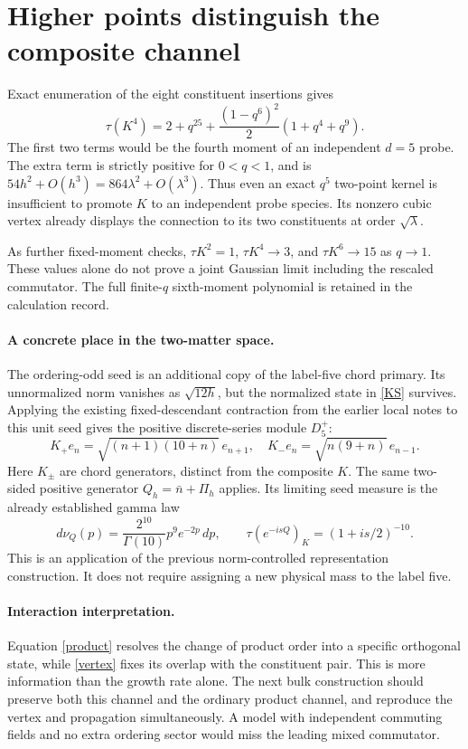 \documentclass[11pt,a4paper]{article}
\newcommand{\av}[1]{\tau\!\left(#1\right)}
\begin{document}
\newpage
\section{Higher points distinguish the composite channel}
Exact enumeration of the eight constituent insertions gives
\begin{equation}
 \boxed{\av{K^4}=2+q^{25}
       +\frac{(1-q^6)^2}{2}(1+q^4+q^9).}\label{fourth}
\end{equation}
The first two terms would be the fourth moment of an independent
$d=5$ probe. The extra term is strictly positive for $0<q<1$, and
is $54h^2+O(h^3)=864\lambda^2+O(\lambda^3)$. Thus even an exact
$q^5$ two-point kernel is insufficient to promote $K$ to an independent
probe species. Its nonzero cubic vertex already displays the connection
to its two constituents at order $\sqrt\lambda$.

As further fixed-moment checks, $\tau K^2=1$, $\tau K^4\to3$, and
$\tau K^6\to15$ as $q\to1$. These values alone do not prove a joint
Gaussian limit including the rescaled commutator. The full finite-$q$
sixth-moment polynomial is retained in the calculation record.

\paragraph{A concrete place in the two-matter space.}
The ordering-odd seed is an additional copy of the label-five chord
primary. Its unnormalized norm vanishes as $\sqrt{12h}$, but the
normalized state in \eqref{KS} survives. Applying the existing
fixed-descendant contraction from the earlier local notes \cite{local}
to this unit seed gives the positive discrete-series module $D^+_5$:
\[
 K_+e_n=\sqrt{(n+1)(10+n)}\,e_{n+1},\quad
 K_-e_n=\sqrt{n(9+n)}\,e_{n-1}.
\]
Here $K_\pm$ are chord generators, distinct from the composite $K$.
The same two-sided positive generator $Q_h=\bar n+\Pi_h$ applies.
Its limiting seed measure is the already established gamma law
\begin{equation}
 d\nu_Q(p)=\frac{2^{10}}{\Gamma(10)}p^9e^{-2p}\,dp,
 \qquad \av{e^{-isQ}}_K=(1+is/2)^{-10}.\label{Q}
\end{equation}
This is an application of the previous norm-controlled representation
construction. It does not require assigning a new physical mass to
the label five.

\paragraph{Interaction interpretation.}
Equation \eqref{product} resolves the change of product order into a
specific orthogonal state, while \eqref{vertex} fixes its overlap with
the constituent pair. This is more information than the growth rate
alone. The next bulk construction should preserve both this channel and
the ordinary product channel, and reproduce the vertex and propagation
simultaneously. A model with independent commuting fields and no extra
ordering sector would miss the leading mixed commutator.
\end{document}
